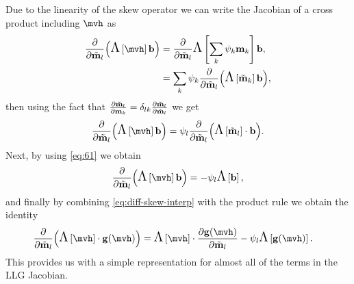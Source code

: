 Due to the linearity of the skew operator we can write the Jacobian of a cross product including $\mvh$ as
\begin{equation}
  \begin{aligned}
    \pd{}{\mvdis_l} \bigb{\skewm{\mvh} \bv} &= \pd{}{\mvdis_l} \skewm{\intp{\mv}} \bv, \\
    &= \sum_k \sbf_k \pd{}{\mvdis_l} \bigb{\skewm{\mvdis_k} \bv},
  \end{aligned}
\end{equation}
then using the fact that $\frac{\partial \tilde{\boldsymbol{\mathrm{m}}}_l}{\partial \boldsymbol{\mathrm{m}}_{k}} = \delta_{lk} \frac{\partial \tilde{\boldsymbol{\mathrm{m}}}_l}{\partial \tilde{\boldsymbol{\mathrm{m}}}_l}$ we get
\begin{equation}
  \pd{}{\mvdis_l} \bigb{\skewm{\mvh} \bv}  = \sbf_l \pd{}{\mvdis_l} \bigb{\skewm{\mvdis_l} \cdot \bv}.
\end{equation}
Next, by using \cref{eq:61} we obtain
\begin{equation}
  \pd{}{\mvdis_l} \bigb{\skewm{\mvh} \bv} = - \sbf_l\skewm{\bv},
  \label{eq:diff-skew-interp}
\end{equation}
and finally by combining \cref{eq:diff-skew-interp} with the product rule we obtain the identity
\begin{equation}
  \begin{aligned}
    \pd{}{\mvdis_l} \bigb{\skewm{\mvh}\cdot \gv(\mvh)}
    &= \skewm{\mvh}\cdot \pd{\gv(\mvh)}{\mvdis_l} - \sbf_l \skewm{\gv(\mvh)}.
    \label{eq:68}
  \end{aligned}
\end{equation}
This provides us with a simple representation for almost all of the terms in the LLG Jacobian.


